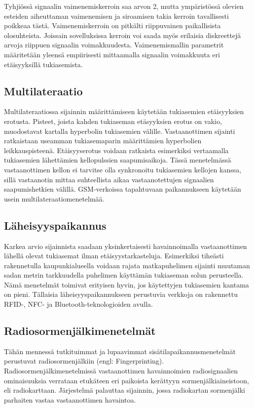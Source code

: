 Tyhjiössä signaalin vaimenemiskerroin saa arvon 2, mutta ympäristössä olevien
esteiden aiheuttaman vaimenemisen ja siroamisen takia kerroin tavallisesti
poikkeaa tästä. Vaimenemiskerroin on pitkälti riippuvainen paikallisista
olosuhteista. Joissain sovelluksissa kerroin voi saada myös erilaisia
diskreettejä arvoja riippuen signaalin voimakkuudesta. Vaimenemismallin
parametrit määritetään yleensä empiirisesti mittaamalla signaalin voimakkuuta
eri etäisyyksillä tukiasemista.

\subsection{Multilateraatio}

Multilateraatiossa sijainnin määrittämiseen käytetään tukiasemien etäisyyksien
erotusta. Pisteet, joista kahden tukiaseman etäsyyksien erotus on vakio,
muodostavat kartalla hyperbolin tukiasemien välille. Vastaanottimen sijainti
ratkaistaan useamman tukiasemaparin määrittämien hyperbolien leikkauspisteenä.
Etäisyyserotus voidaan ratkaista esimerkiksi vertaamalla tukiasemien
lähettämien kellopulssien saapumisaikoja. Tässä menetelmässä vastaanottimen
kellon ei tarvitse olla synkronoitu tukiasemien kellojen kanssa, sillä
vastaanotin mittaa suhteellista aikaa vastaanotettujen signaalien
saapumishetkien välillä. GSM-verkoissa tapahtuvaan paikannukseen käytetään
usein multilateraatiomenetelmää.

\subsection{Läheisyyspaikannus}

Karkea arvio sijainnista saadaan yksinkertaisesti havainnoimalla vastaanottimen
lähellä olevat tukiasemat ilman etäisyystarkasteluja.  Esimerkiksi tiheästi
rakennetulla kaupunkialueella voidaan rajata matkapuhelimen sijainti muutaman
sadan metrin tarkkuudella puhelimen käyttämän tukiaseman solun perusteella.
Nämä menetelmät toimivat erityisen hyvin, jos käytettyjen tukiasemien kantama
on pieni. Tällaisia läheisyyspaikannukseen perustuvia verkkoja on rakennettu
RFID-, NFC- ja Bluetooth-teknologioiden avulla.

\subsection{Radiosormenjälkimenetelmät}

Tähän mennessä tutkituimmat ja lupaavimmat sisätilapaikannusmenetelmät
perustuvat radiosormenjälkiin (engl: Fingerprinting).
Radiosormenjälkimenetelmissä vastaanottimen havainnoimien radiosignaalien
ominaisuuksia verrataan etukäteen eri paikoista kerättyyn
sormenjälkiaineistoon, eli radiokarttaan.  Järjestelmä palauttaa sijainnin,
jossa radiokartan sormenjälki parhaiten vastaa vastaanottimen havaintoa.

